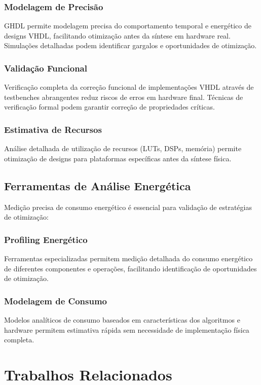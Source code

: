 \subsubsection{Modelagem de Precisão}
GHDL permite modelagem precisa do comportamento temporal e energético de designs VHDL, facilitando otimização antes da síntese em hardware real. Simulações detalhadas podem identificar gargalos e oportunidades de otimização.

\subsubsection{Validação Funcional}
Verificação completa da correção funcional de implementações VHDL através de testbenches abrangentes reduz riscos de erros em hardware final. Técnicas de verificação formal podem garantir correção de propriedades críticas.

\subsubsection{Estimativa de Recursos}
Análise detalhada de utilização de recursos (LUTs, DSPs, memória) permite otimização de designs para plataformas específicas antes da síntese física.

\subsection{Ferramentas de Análise Energética}
Medição precisa de consumo energético é essencial para validação de estratégias de otimização:

\subsubsection{Profiling Energético}
Ferramentas especializadas permitem medição detalhada do consumo energético de diferentes componentes e operações, facilitando identificação de oportunidades de otimização.

\subsubsection{Modelagem de Consumo}
Modelos analíticos de consumo baseados em características dos algoritmos e hardware permitem estimativa rápida sem necessidade de implementação física completa.

\section{Trabalhos Relacionados}\label{sec:trabalhos_relacionados}

